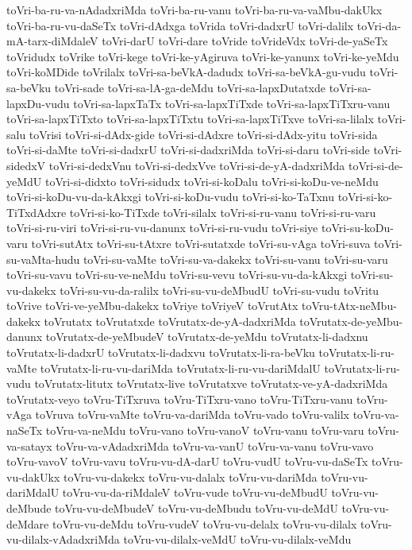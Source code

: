 {toVri-ba-ru-va-nAdadxriMda
toVri-ba-ru-vanu
toVri-ba-ru-va-vaMbu-dakUkx
toVri-ba-ru-vu-daSeTx
toVri-dAdxga
toVrida
toVri-dadxrU
toVri-dalilx
toVri-da-mA-tarx-diMdaleV
toVri-darU
toVri-dare
toVride
toVrideVdx
toVri-de-yaSeTx
toVridudx
toVrike
toVri-kege
toVri-ke-yAgiruva
toVri-ke-yanunx
toVri-ke-yeMdu
toVri-koMDide
toVrilalx
toVri-sa-beVkA-dadudx
toVri-sa-beVkA-gu-vudu
toVri-sa-beVku
toVri-sade
toVri-sa-lA-ga-deMdu
toVri-sa-lapxDutatxde
toVri-sa-lapxDu-vudu
toVri-sa-lapxTaTx
toVri-sa-lapxTiTxde
toVri-sa-lapxTiTxru-vanu
toVri-sa-lapxTiTxto
toVri-sa-lapxTiTxtu
toVri-sa-lapxTiTxve
toVri-sa-lilalx
toVri-salu
toVrisi
toVri-si-dAdx-gide
toVri-si-dAdxre
toVri-si-dAdx-yitu
toVri-sida
toVri-si-daMte
toVri-si-dadxrU
toVri-si-dadxriMda
toVri-si-daru
toVri-side
toVri-sidedxV
toVri-si-dedxVnu
toVri-si-dedxVve
toVri-si-de-yA-dadxriMda
toVri-si-de-yeMdU
toVri-si-didxto
toVri-sidudx
toVri-si-koDalu
toVri-si-koDu-ve-neMdu
toVri-si-koDu-vu-da-kAkxgi
toVri-si-koDu-vudu
toVri-si-ko-TaTxnu
toVri-si-ko-TiTxdAdxre
toVri-si-ko-TiTxde
toVri-silalx
toVri-si-ru-vanu
toVri-si-ru-varu
toVri-si-ru-viri
toVri-si-ru-vu-danunx
toVri-si-ru-vudu
toVri-siye
toVri-su-koDu-varu
toVri-sutAtx
toVri-su-tAtxre
toVri-sutatxde
toVri-su-vAga
toVri-suva
toVri-su-vaMta-hudu
toVri-su-vaMte
toVri-su-va-dakekx
toVri-su-vanu
toVri-su-varu
toVri-su-vavu
toVri-su-ve-neMdu
toVri-su-vevu
toVri-su-vu-da-kAkxgi
toVri-su-vu-dakekx
toVri-su-vu-da-ralilx
toVri-su-vu-deMbudU
toVri-su-vudu
toVritu
toVrive
toVri-ve-yeMbu-dakekx
toVriye
toVriyeV
toVrutAtx
toVru-tAtx-neMbu-dakekx
toVrutatx
toVrutatxde
toVrutatx-de-yA-dadxriMda
toVrutatx-de-yeMbu-danunx
toVrutatx-de-yeMbudeV
toVrutatx-de-yeMdu
toVrutatx-li-dadxnu
toVrutatx-li-dadxrU
toVrutatx-li-dadxvu
toVrutatx-li-ra-beVku
toVrutatx-li-ru-vaMte
toVrutatx-li-ru-vu-dariMda
toVrutatx-li-ru-vu-dariMdalU
toVrutatx-li-ru-vudu
toVrutatx-litutx
toVrutatx-live
toVrutatxve
toVrutatx-ve-yA-dadxriMda
toVrutatx-veyo
toVru-TiTxruva
toVru-TiTxru-vano
toVru-TiTxru-vanu
toVru-vAga
toVruva
toVru-vaMte
toVru-va-dariMda
toVru-vado
toVru-valilx
toVru-va-naSeTx
toVru-va-neMdu
toVru-vano
toVru-vanoV
toVru-vanu
toVru-varu
toVru-va-satayx
toVru-va-vAdadxriMda
toVru-va-vanU
toVru-va-vanu
toVru-vavo
toVru-vavoV
toVru-vavu
toVru-vu-dA-darU
toVru-vudU
toVru-vu-daSeTx
toVru-vu-dakUkx
toVru-vu-dakekx
toVru-vu-dalalx
toVru-vu-dariMda
toVru-vu-dariMdalU
toVru-vu-da-riMdaleV
toVru-vude
toVru-vu-deMbudU
toVru-vu-deMbude
toVru-vu-deMbudeV
toVru-vu-deMbudu
toVru-vu-deMdU
toVru-vu-deMdare
toVru-vu-deMdu
toVru-vudeV
toVru-vu-delalx
toVru-vu-dilalx
toVru-vu-dilalx-vAdadxriMda
toVru-vu-dilalx-veMdU
toVru-vu-dilalx-veMdu
}
